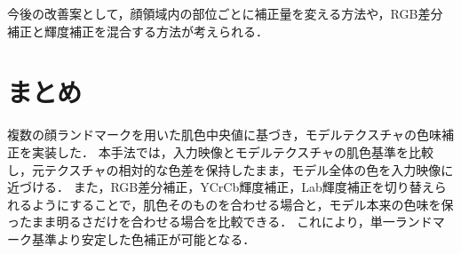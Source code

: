 \documentclass[uplatex,dvipdfmx]{jsarticle}
\begin{document}
今後の改善案として，顔領域内の部位ごとに補正量を変える方法や，RGB差分補正と輝度補正を混合する方法が考えられる．

\section{まとめ}

複数の顔ランドマークを用いた肌色中央値に基づき，モデルテクスチャの色味補正を実装した．
本手法では，入力映像とモデルテクスチャの肌色基準を比較し，元テクスチャの相対的な色差を保持したまま，モデル全体の色を入力映像に近づける．
また，RGB差分補正，YCrCb輝度補正，Lab輝度補正を切り替えられるようにすることで，肌色そのものを合わせる場合と，モデル本来の色味を保ったまま明るさだけを合わせる場合を比較できる．
これにより，単一ランドマーク基準より安定した色補正が可能となる．
\end{document}
